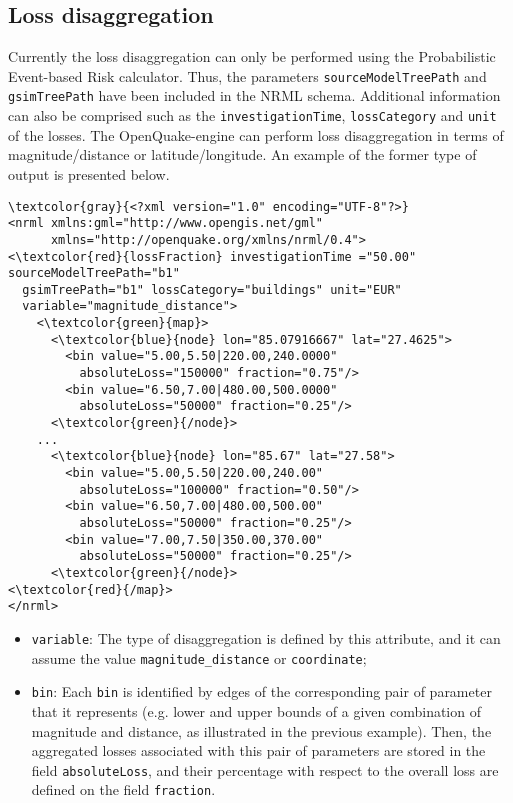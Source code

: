 \subsection{Loss disaggregation}
Currently the loss disaggregation can only be performed using the Probabilistic Event-based Risk calculator. Thus, the parameters \Verb+sourceModelTreePath+ and \Verb+gsimTreePath+ have been included in the NRML schema. Additional information can also be comprised such as the \Verb+investigationTime+, \Verb+lossCategory+ and \Verb+unit+ of the losses. The OpenQuake-engine can perform loss disaggregation in terms of magnitude/distance or latitude/longitude. An example of the former type of output is presented below.

\begin{Verbatim}[frame=single, commandchars=\\\{\}, samepage=false]
\textcolor{gray}{<?xml version="1.0" encoding="UTF-8"?>}
<nrml xmlns:gml="http://www.opengis.net/gml"
      xmlns="http://openquake.org/xmlns/nrml/0.4">
<\textcolor{red}{lossFraction} investigationTime ="50.00" sourceModelTreePath="b1"
  gsimTreePath="b1" lossCategory="buildings" unit="EUR"
  variable="magnitude_distance">
    <\textcolor{green}{map}>
      <\textcolor{blue}{node} lon="85.07916667" lat="27.4625">
        <bin value="5.00,5.50|220.00,240.0000"
          absoluteLoss="150000" fraction="0.75"/>
        <bin value="6.50,7.00|480.00,500.0000"
          absoluteLoss="50000" fraction="0.25"/>
      <\textcolor{green}{/node}>
    ...
      <\textcolor{blue}{node} lon="85.67" lat="27.58">
        <bin value="5.00,5.50|220.00,240.00"
          absoluteLoss="100000" fraction="0.50"/>
        <bin value="6.50,7.00|480.00,500.00"
          absoluteLoss="50000" fraction="0.25"/>
        <bin value="7.00,7.50|350.00,370.00"
          absoluteLoss="50000" fraction="0.25"/>
      <\textcolor{green}{/node}>
<\textcolor{red}{/map}>
</nrml>
\end{Verbatim}

\begin{itemize}
\item  \Verb+variable+: The type of disaggregation is defined by this attribute, and it can assume the value \Verb+magnitude_distance+ or \Verb+coordinate+;
\item  \Verb+bin+: Each \Verb+bin+ is identified by edges of the corresponding pair of parameter that it represents (e.g. lower and upper bounds of a given combination of magnitude and distance, as illustrated in the previous example). Then, the aggregated losses associated with this pair of parameters are stored in the field \Verb+absoluteLoss+, and their percentage with respect to the overall loss are defined on the field \Verb+fraction+.
\end{itemize}

